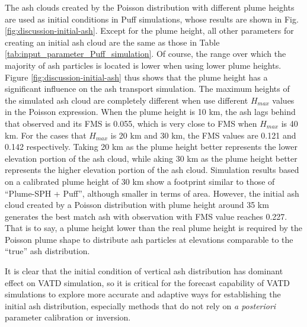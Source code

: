 \documentclass[utf8]{frontiersSCNS} %
\begin{document}
The ash clouds created by the Poisson distribution with different plume heights are used as initial conditions in Puff simulations, whose results are shown in Fig. \ref{fig:discussion-initial-ash}. Except for the plume height, all other parameters for creating an initial ash cloud are the same as those in Table \ref{tab:input_parameter_Puff_simulation}. Of course, the range over which the majority of ash particles is located is lower when using lower plume heights. 
Figure \ref{fig:discussion-initial-ash} thus shows that the plume height has a significant influence on the ash transport simulation. The maximum heights of the simulated ash cloud are completely different when use different $H_{max}$ values in the Poisson expression. When the plume height is 10 km, the ash lags behind that observed and its FMS is 0.055, which is very close to FMS when $H_{max}$ is 40 km. For the cases that  $H_{max}$ is 20 km and 30 km, the FMS values are 0.121 and 0.142 respectively. Taking 20 km as the plume height better represents the lower elevation portion of the ash cloud, while aking 30 km as the plume height better represents the higher elevation portion of the ash cloud. 
Simulation results based on a calibrated plume height of 30 km show a footprint similar to those of ``Plume-SPH + Puff'', although smaller in terms of area. However, the initial ash cloud created by a Poisson distribution with plume height around 35 km generates the best match ash with observation with FMS value reaches 0.227.  That is to say, a plume height lower than the real plume height is required by the Poisson plume shape to distribute ash particles at elevations comparable to the ``true'' ash distribution. 

It is clear that the initial condition of vertical ash distribution has dominant effect on VATD simulation, so it is critical for the forecast capability of VATD simulations to explore more accurate and adaptive ways for establishing the initial ash distribution, especially methods that do not rely on \textit{a posteriori} parameter calibration or inversion.
\end{document}
